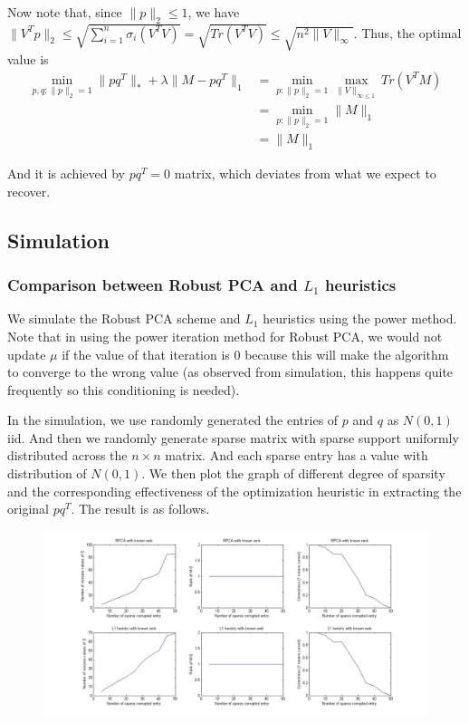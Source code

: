 Now note that, since $\|p\|_{2}\le1$, we have $\|V^{T}p\|_{2}\le\sqrt{\sum_{i=1}^{n}\sigma_{i}(V^{T}V)}=\sqrt{Tr(V^{T}V)}\le\sqrt{n^{2}\|V\|_{\infty}}$.
Thus, the optimal value is
\begin{align*}
\min_{p,q:\|p\|_{2}=1}\|pq^{T}\|_{*}+\lambda\|M-pq^{T}\|_{1}
& = \min_{p:\|p\|_{2}=1}\max_{\|V\|_{\infty\le1}}Tr(V^{T}M)\\
& = \min_{p:\|p\|_{2}=1}\|M\|_{1}\\
& = \|M\|_{1}
\end{align*}


And it is achieved by $pq^{T}=0$ matrix, which deviates from what
we expect to recover.


\subsection{Simulation }


\subsubsection{Comparison between Robust PCA and $L_{1}$ heuristics}

We simulate the Robust PCA scheme and $L_{1}$ heuristics using the power method. Note that in using the power iteration method for Robust PCA, we would not update $\mu$ if the value of that iteration is 0 because this will make the algorithm to converge to the wrong value (as observed from simulation, this happens quite frequently so this conditioning is needed).

In the simulation, we use randomly generated the entries of $p$ and $q$ as $N(0,1)$ iid. And then we randomly generate sparse matrix with sparse support uniformly distributed across the $n \times n$ matrix. And each sparse entry has a value with distribution of $N(0,1)$. We then plot the graph of different degree of sparsity and the corresponding effectiveness of the optimization heuristic in extracting the original $pq^{T}$. The result is as follows.

\begin{figure}[h!]
\label{fig:comparison}
\centering
\includegraphics[width=16cm]{../figures/compare.jpg}
\end{figure}

